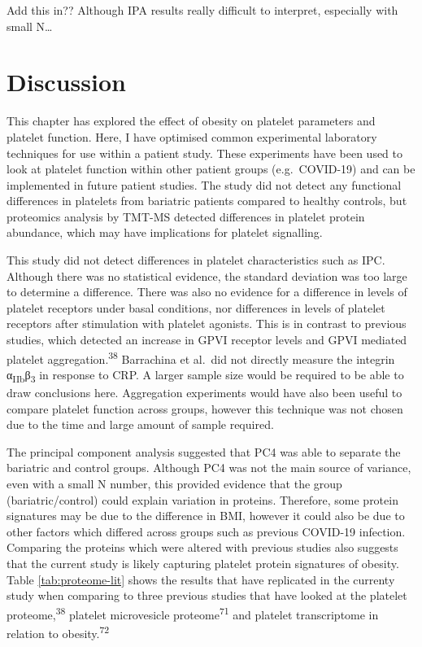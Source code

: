 \documentclass[11pt,twoside]{bristolthesis}
\begin{document}
Add this in?? Although IPA results really difficult to interpret, especially with small N\ldots{}

\hypertarget{discussion-1}{%
\section{Discussion}\label{discussion-1}}

This chapter has explored the effect of obesity on platelet parameters and platelet function. Here, I have optimised common experimental laboratory techniques for use within a patient study. These experiments have been used to look at platelet function within other patient groups (e.g.~COVID-19) and can be implemented in future patient studies. The study did not detect any functional differences in platelets from bariatric patients compared to healthy controls, but proteomics analysis by TMT-MS detected differences in platelet protein abundance, which may have implications for platelet signalling.

This study did not detect differences in platelet characteristics such as IPC. Although there was no statistical evidence, the standard deviation was too large to determine a difference. There was also no evidence for a difference in levels of platelet receptors under basal conditions, nor differences in levels of platelet receptors after stimulation with platelet agonists. This is in contrast to previous studies, which detected an increase in GPVI receptor levels and GPVI mediated platelet aggregation.\textsuperscript{38} Barrachina et al.~did not directly measure the integrin α\textsubscript{IIb}β\textsubscript{3} in response to CRP. A larger sample size would be required to be able to draw conclusions here. Aggregation experiments would have also been useful to compare platelet function across groups, however this technique was not chosen due to the time and large amount of sample required.

The principal component analysis suggested that PC4 was able to separate the bariatric and control groups. Although PC4 was not the main source of variance, even with a small N number, this provided evidence that the group (bariatric/control) could explain variation in proteins. Therefore, some protein signatures may be due to the difference in BMI, however it could also be due to other factors which differed across groups such as previous COVID-19 infection. Comparing the proteins which were altered with previous studies also suggests that the current study is likely capturing platelet protein signatures of obesity. Table \ref{tab:proteome-lit} shows the results that have replicated in the currenty study when comparing to three previous studies that have looked at the platelet proteome,\textsuperscript{38} platelet microvesicle proteome\textsuperscript{71} and platelet transcriptome in relation to obesity.\textsuperscript{72}
\end{document}
